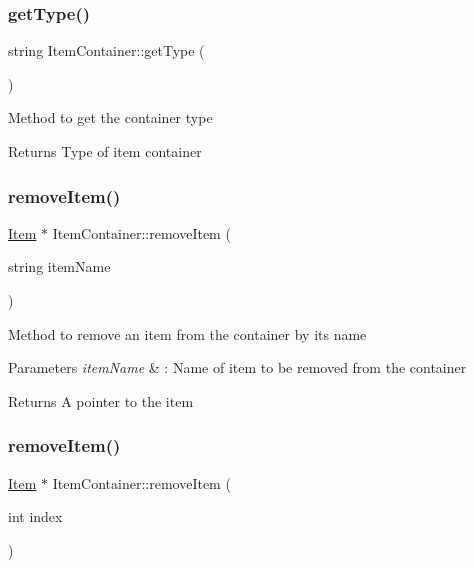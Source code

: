 \subsubsection{\texorpdfstring{get\+Type()}{getType()}}
{\footnotesize\ttfamily string Item\+Container\+::get\+Type (\begin{DoxyParamCaption}{ }\end{DoxyParamCaption})}

Method to get the container type \begin{DoxyReturn}{Returns}
Type of item container 
\end{DoxyReturn}
\hypertarget{class_item_container_ae8065460f5145a445b7b49048696ad6b}{}\label{class_item_container_ae8065460f5145a445b7b49048696ad6b} 
\subsubsection{\texorpdfstring{remove\+Item()}{removeItem()}\hspace{0.1cm}{\footnotesize\ttfamily [1/2]}}
{\footnotesize\ttfamily \hyperlink{class_item}{Item} $\ast$ Item\+Container\+::remove\+Item (\begin{DoxyParamCaption}\item[{string}]{item\+Name }\end{DoxyParamCaption})}

Method to remove an item from the container by its name 
\begin{DoxyParams}{Parameters}
{\em item\+Name} & \+: Name of item to be removed from the container \\
\hline
\end{DoxyParams}
\begin{DoxyReturn}{Returns}
A pointer to the item 
\end{DoxyReturn}
\hypertarget{class_item_container_a0bdcc60d80e57a9995b7e99adf09c15e}{}\label{class_item_container_a0bdcc60d80e57a9995b7e99adf09c15e} 
\subsubsection{\texorpdfstring{remove\+Item()}{removeItem()}\hspace{0.1cm}{\footnotesize\ttfamily [2/2]}}
{\footnotesize\ttfamily \hyperlink{class_item}{Item} $\ast$ Item\+Container\+::remove\+Item (\begin{DoxyParamCaption}\item[{int}]{index }\end{DoxyParamCaption})}

